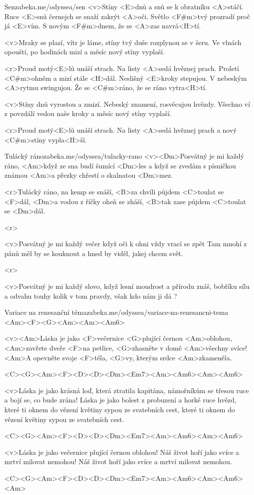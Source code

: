 \begin{song}[Lucie]{52}{Sen}{zabeka.me/odyssea/sen}
<v>Stíny <E>dnů a snů se k obratníku <A>stáčí. 
Ruce <E>snů černejch se snaží zakrýt <A>oči. 
Světlo <F#m>tvý prozradí proč já <E>vím. 
S novým <F#m>dnem, že se <A>zas navrá<H>tí.

<v>Mraky se plazí, vítr je láme, 
stíny tvý duše rozplynou se v šeru. 
Ve vlnách opouští, po hodinách mizí 
a měsíc nový stíny vyplaší.

<r>Proud motý<E>lů unáší strach.
Na listy <A>sedá hvěznej prach.
Proletí <C#m>ohněm a mizí stále <H>dál.
Neslišný <E>kroky stepujou.
V nebeským <A>rytmu swingujou. 
Že se <C#m>ráno, že se ráno vytra<H>tí. 

<v>Stíny dnů vyrostou a zmizí.
Nebeský znamení, rosvěcujou hvězdy. 
Všechno ví z povzdálí vedou naše kroky 
a měsíc nový stíny vyplaší. 

<r>Proud motý<E>lů unáší strach.
Na listy <A>sedá hvěznej prach
a nový <C#m>stíny vypla<H>ší.
\end{song}
\begin{song}[Nedvědi]{53}{Tulácký ráno}{zabeka.me/odyssea/tulacky-rano}
<v><Dm>Posvátný je mi každý ráno,
<Am>když ze sna budí šumící <Dm>les
a když se zvedám s písničkou známou
<Am>a přezky chřestí o skalnatou <Dm>mez.

<r>Tulácký ráno, na kemp se snáší,
<B>za chvíli půjdem <C>toulat se <F>dál,
<Dm>a vodou z říčky oheň se zháší,
<B>tak zase půjdem <C>toulat se <Dm>dál.

<r>

<v>Posvátný je mi každý večer
když oči k ohni vždy vrací se zpět
Tam mnohí z pánů měl by se kouknout
a hned by viděl, jakej chcem svět.

<r>

<v>Posvátný je mi každý slovo,
když lesní moudrost a přírodu znáš,
bobříku sílu a odvahu touhy
kolik v tom pravdy, však kdo nám ji dá ?
\end{song}
\begin{song}{54}{Variace na renesanční téma}{zabeka.me/odyssea/variace-na-renesancni-tema}
<Am><F><G><Am><Am><Am6>

<v><Am>Láska je jako <F>večernice <G>plující černou <Am>oblohou,
<Am>zavřete dveře <F>na petlice, <G>zhasněte v domě <Am>všechny svíce!
<Am>A opevněte svoje <F>těla, <G>vy, kterým srdce <Am>zkameněla. 

<C><G><Am><F><D><D><Dm><Em7><Am><Am6><Am><Am6>

<v>Láska je jako krásná loď, která ztratila kapitána,
námořníkům se třesou ruce a bojí se, co bude zrána!
Láska je jako bolest z probuzení a horké ruce hvězd,
které ti oknem do vězení květiny sypou ze svatebních cest,
které ti oknem do vězení květiny sypou ze svatebních cest.

<C><G><Am><F><D><D><Dm><Em7><Am><Am6><Am><Am6>

<v>Láska je jako večernice plující černou oblohou!
Náš život hoří jako svíce a mrtví milovat nemohou!
Náš život hoří jako svíce a mrtví milovat nemohou.

<C><G><Am><F><D><D><Dm><Em7><Am><Am6><Am><Am6><Am>

\end{song}
